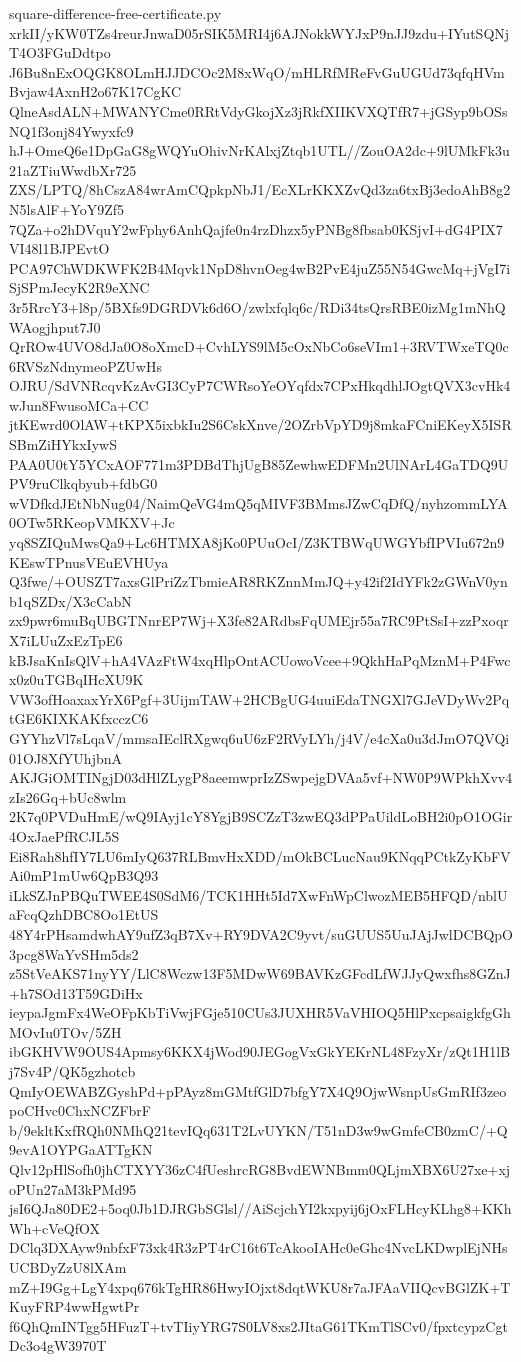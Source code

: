 \documentclass[11pt]{article}
\theoremstyle{definition}
\theoremstyle{remark}
\begin{document}
\begin{filecontents*}[overwrite]{square-difference-free-certificate.py}
xrkII/yKW0TZs4reurJnwaD05rSIK5MRI4j6AJNokkWYJxP9nJJ9zdu+IYutSQNjT4O3FGuDdtpo
J6Bu8nExOQGK8OLmHJJDCOc2M8xWqO/mHLRfMReFvGuUGUd73qfqHVmBvjaw4AxnH2o67K17CgKC
QlneAsdALN+MWANYCme0RRtVdyGkojXz3jRkfXIIKVXQTfR7+jGSyp9bOSsNQ1f3onj84Ywyxfc9
hJ+OmeQ6e1DpGaG8gWQYuOhivNrKAlxjZtqb1UTL//ZouOA2dc+9lUMkFk3u21aZTiuWwdbXr725
ZXS/LPTQ/8hCszA84wrAmCQpkpNbJ1/EcXLrKKXZvQd3za6txBj3edoAhB8g2N5lsAlF+YoY9Zf5
7QZa+o2hDVquY2wFphy6AnhQajfe0n4rzDhzx5yPNBg8fbsab0KSjvI+dG4PIX7VI48l1BJPEvtO
PCA97ChWDKWFK2B4Mqvk1NpD8hvnOeg4wB2PvE4juZ55N54GwcMq+jVgI7iSjSPmJecyK2R9eXNC
3r5RrcY3+l8p/5BXfs9DGRDVk6d6O/zwlxfqlq6c/RDi34tsQrsRBE0izMg1mNhQWAogjhput7J0
QrROw4UVO8dJa0O8oXmcD+CvhLYS9lM5cOxNbCo6seVIm1+3RVTWxeTQ0c6RVSzNdnymeoPZUwHs
OJRU/SdVNRcqvKzAvGI3CyP7CWRsoYeOYqfdx7CPxHkqdhlJOgtQVX3cvHk4wJun8FwusoMCa+CC
jtKEwrd0OlAW+tKPX5ixbkIu2S6CskXnve/2OZrbVpYD9j8mkaFCniEKeyX5ISRSBmZiHYkxIywS
PAA0U0tY5YCxAOF771m3PDBdThjUgB85ZewhwEDFMn2UlNArL4GaTDQ9UPV9ruClkqbyub+fdbG0
wVDfkdJEtNbNug04/NaimQeVG4mQ5qMIVF3BMmsJZwCqDfQ/nyhzommLYA0OTw5RKeopVMKXV+Jc
yq8SZIQuMwsQa9+Lc6HTMXA8jKo0PUuOcI/Z3KTBWqUWGYbfIPVIu672n9KEswTPnusVEuEVHUya
Q3fwe/+OUSZT7axsGlPriZzTbmieAR8RKZnnMmJQ+y42if2IdYFk2zGWnV0ynb1qSZDx/X3cCabN
zx9pwr6muBqUBGTNnrEP7Wj+X3fe82ARdbsFqUMEjr55a7RC9PtSsI+zzPxoqrX7iLUuZxEzTpE6
kBJsaKnIsQlV+hA4VAzFtW4xqHlpOntACUowoVcee+9QkhHaPqMznM+P4Fwcx0z0uTGBqIHcXU9K
VW3ofHoaxaxYrX6Pgf+3UijmTAW+2HCBgUG4uuiEdaTNGXl7GJeVDyWv2PqtGE6KIXKAKfxcczC6
GYYhzVl7sLqaV/mmsaIEclRXgwq6uU6zF2RVyLYh/j4V/e4cXa0u3dJmO7QVQi01OJ8XfYUhjbnA
AKJGiOMTINgjD03dHlZLygP8aeemwprIzZSwpejgDVAa5vf+NW0P9WPkhXvv4zIs26Gq+bUc8wlm
2K7q0PVDuHmE/wQ9IAyj1cY8YgjB9SCZzT3zwEQ3dPPaUildLoBH2i0pO1OGir4OxJaePfRCJL5S
Ei8Rah8hfIY7LU6mIyQ637RLBmvHxXDD/mOkBCLucNau9KNqqPCtkZyKbFVAi0mP1mUw6QpB3Q93
iLkSZJnPBQuTWEE4S0SdM6/TCK1HHt5Id7XwFnWpClwozMEB5HFQD/nblUaFcqQzhDBC8Oo1EtUS
48Y4rPHsamdwhAY9ufZ3qB7Xv+RY9DVA2C9yvt/suGUUS5UuJAjJwlDCBQpO3pcg8WaYvSHm5ds2
z5StVeAKS71nyYY/LlC8Wczw13F5MDwW69BAVKzGFcdLfWJJyQwxfhs8GZnJ+h7SOd13T59GDiHx
ieypaJgmFx4WeOFpKbTiVwjFGje510CUs3JUXHR5VaVHIOQ5HlPxcpsaigkfgGhMOvIu0TOv/5ZH
ibGKHVW9OUS4Apmsy6KKX4jWod90JEGogVxGkYEKrNL48FzyXr/zQt1H1lBj7Sv4P/QK5gzhotcb
QmIyOEWABZGyshPd+pPAyz8mGMtfGlD7bfgY7X4Q9OjwWsnpUsGmRIf3zeopoCHvc0ChxNCZFbrF
b/9ekltKxfRQh0NMhQ21tevIQq631T2LvUYKN/T51nD3w9wGmfeCB0zmC/+Q9evA1OYPGaATTgKN
Qlv12pHlSofh0jhCTXYY36zC4fUeshrcRG8BvdEWNBmm0QLjmXBX6U27xe+xjoPUn27aM3kPMd95
jsI6QJa80DE2+5oq0Jb1DJRGbSGlsl//AiScjchYI2kxpyij6jOxFLHcyKLhg8+KKhWh+cVeQfOX
DClq3DXAyw9nbfxF73xk4R3zPT4rC16t6TcAkooIAHc0eGhc4NvcLKDwplEjNHsUCBDyZzU8lXAm
mZ+I9Gg+LgY4xpq676kTgHR86HwyIOjxt8dqtWKU8r7aJFAaVIIQcvBGlZK+TKuyFRP4wwHgwtPr
f6QhQmINTgg5HFuzT+tvTIiyYRG7S0LV8xs2JItaG61TKmTlSCv0/fpxtcypzCgtDc3o4gW3970T

\end{filecontents*}
\end{document}
